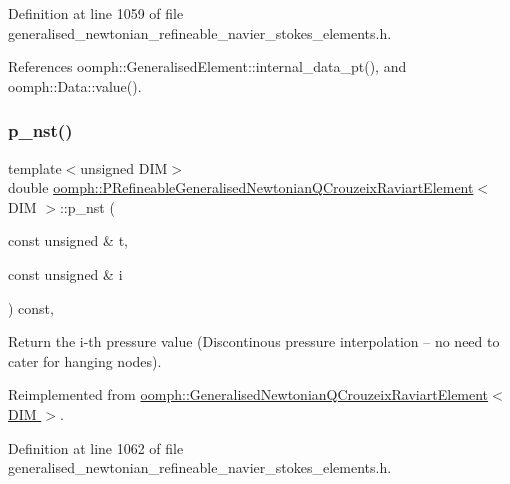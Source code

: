 Definition at line 1059 of file generalised\+\_\+newtonian\+\_\+refineable\+\_\+navier\+\_\+stokes\+\_\+elements.\+h.



References oomph\+::\+Generalised\+Element\+::internal\+\_\+data\+\_\+pt(), and oomph\+::\+Data\+::value().

\mbox{\label{classoomph_1_1PRefineableGeneralisedNewtonianQCrouzeixRaviartElement_a2c14443dfbea1eedbafd06caca166dd9}} 
\subsubsection{\texorpdfstring{p\+\_\+nst()}{p\_nst()}\hspace{0.1cm}{\footnotesize\ttfamily [2/2]}}
{\footnotesize\ttfamily template$<$unsigned D\+IM$>$ \\
double \hyperlink{classoomph_1_1PRefineableGeneralisedNewtonianQCrouzeixRaviartElement}{oomph\+::\+P\+Refineable\+Generalised\+Newtonian\+Q\+Crouzeix\+Raviart\+Element}$<$ D\+IM $>$\+::p\+\_\+nst (\begin{DoxyParamCaption}\item[{const unsigned \&}]{t,  }\item[{const unsigned \&}]{i }\end{DoxyParamCaption}) const\hspace{0.3cm}{\ttfamily [inline]}, {\ttfamily [virtual]}}



Return the i-\/th pressure value (Discontinous pressure interpolation -- no need to cater for hanging nodes). 



Reimplemented from \hyperlink{classoomph_1_1GeneralisedNewtonianQCrouzeixRaviartElement_ab7a1cfbce6b38ad1df95a9c3a6b8f597}{oomph\+::\+Generalised\+Newtonian\+Q\+Crouzeix\+Raviart\+Element$<$ D\+I\+M $>$}.



Definition at line 1062 of file generalised\+\_\+newtonian\+\_\+refineable\+\_\+navier\+\_\+stokes\+\_\+elements.\+h.



